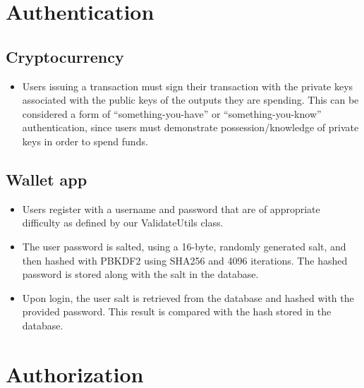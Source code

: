 \documentclass[a4paper,12pt]{article}
\begin{document}
\section{Authentication}

\subsection{Cryptocurrency}

\begin{itemize}
\item Users issuing a transaction must sign their transaction with the private keys associated with the public keys of the outputs they are spending.
This can be considered a form of ``something-you-have'' or ``something-you-know'' authentication, since users must demonstrate possession/knowledge of private keys in order to spend funds.
\end{itemize}

\subsection{Wallet app}

\begin{itemize}
\item Users register with a username and password that are of appropriate difficulty as defined by our ValidateUtils class.
\item The user password is salted, using a 16-byte, randomly generated salt, and then hashed with PBKDF2 using SHA256 and 4096 iterations. The hashed password is stored along with the salt in the database.
\item Upon login, the user salt is retrieved from the database and hashed with the provided password. This result is compared with the hash stored in the database. 
\end{itemize}


\section{Authorization}
\end{document}
